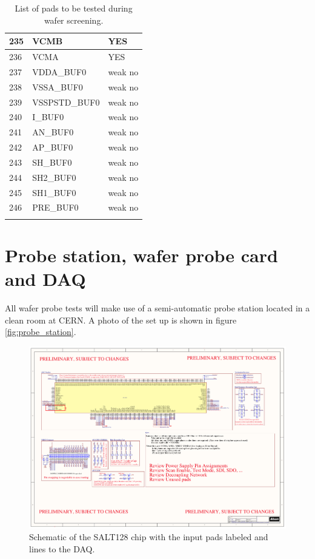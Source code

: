 \documentclass{lhcbnote}
\begin{document}
\begin{longtable}{ | l | l | l | }
	235 & VCMB & YES \\ \hline
	236 & VCMA & YES \\ \hline
	237 & VDDA\_BUF0 & weak no \\ \hline
	238 & VSSA\_BUF0 & weak no \\ \hline
	239 & VSSPSTD\_BUF0 & weak no \\ \hline
	240 & I\_BUF0 & weak no \\ \hline
	241 & AN\_BUF0 & weak no \\ \hline
	242 & AP\_BUF0 & weak no \\ \hline
	243 & SH\_BUF0 & weak no \\ \hline
	244 & SH2\_BUF0 & weak no \\ \hline
	245 & SH1\_BUF0 & weak no \\ \hline
	246 & PRE\_BUF0 & weak no \\ \hline
\caption{List of pads to be tested during wafer screening.}
\label{table:pin}
\end{longtable}



\section{Probe station, wafer probe card and DAQ}

All wafer probe tests will make use of a semi-automatic probe station located in a clean room at CERN. A photo of the set up is shown in figure \ref{fig:probe_station}. 

\begin{figure}
\centering
\includegraphics[width=\textwidth]{figures/SALT128}
\caption{Schematic of the SALT128 chip with the input pads labeled and lines to the DAQ.}
\label{fig:salt}
\end{figure}
\end{document}
